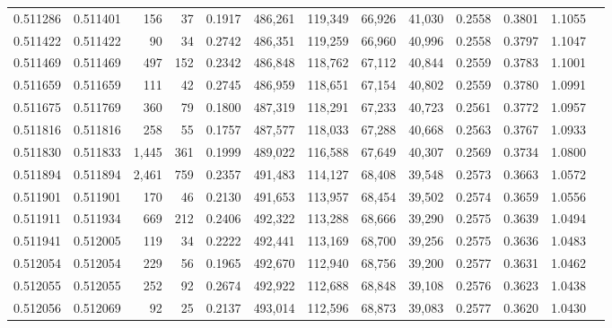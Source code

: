 \begin{tabular}{rrrrrrrrrrrrr}
0.511286 & 0.511401 &   156 &    37 &                                     0.1917 & 486,261 & 119,349 &  66,926 &  41,030 & 0.2558 & 0.3801 & 1.1055 \\
0.511422 & 0.511422 &    90 &    34 &                                     0.2742 & 486,351 & 119,259 &  66,960 &  40,996 & 0.2558 & 0.3797 & 1.1047 \\
0.511469 & 0.511469 &   497 &   152 &                                     0.2342 & 486,848 & 118,762 &  67,112 &  40,844 & 0.2559 & 0.3783 & 1.1001 \\
0.511659 & 0.511659 &   111 &    42 &                                     0.2745 & 486,959 & 118,651 &  67,154 &  40,802 & 0.2559 & 0.3780 & 1.0991 \\
0.511675 & 0.511769 &   360 &    79 &                                     0.1800 & 487,319 & 118,291 &  67,233 &  40,723 & 0.2561 & 0.3772 & 1.0957 \\
0.511816 & 0.511816 &   258 &    55 &                                     0.1757 & 487,577 & 118,033 &  67,288 &  40,668 & 0.2563 & 0.3767 & 1.0933 \\
0.511830 & 0.511833 & 1,445 &   361 &                                     0.1999 & 489,022 & 116,588 &  67,649 &  40,307 & 0.2569 & 0.3734 & 1.0800 \\
0.511894 & 0.511894 & 2,461 &   759 &                                     0.2357 & 491,483 & 114,127 &  68,408 &  39,548 & 0.2573 & 0.3663 & 1.0572 \\
0.511901 & 0.511901 &   170 &    46 &                                     0.2130 & 491,653 & 113,957 &  68,454 &  39,502 & 0.2574 & 0.3659 & 1.0556 \\
0.511911 & 0.511934 &   669 &   212 &                                     0.2406 & 492,322 & 113,288 &  68,666 &  39,290 & 0.2575 & 0.3639 & 1.0494 \\
0.511941 & 0.512005 &   119 &    34 &                                     0.2222 & 492,441 & 113,169 &  68,700 &  39,256 & 0.2575 & 0.3636 & 1.0483 \\
0.512054 & 0.512054 &   229 &    56 &                                     0.1965 & 492,670 & 112,940 &  68,756 &  39,200 & 0.2577 & 0.3631 & 1.0462 \\
0.512055 & 0.512055 &   252 &    92 &                                     0.2674 & 492,922 & 112,688 &  68,848 &  39,108 & 0.2576 & 0.3623 & 1.0438 \\
0.512056 & 0.512069 &    92 &    25 &                                     0.2137 & 493,014 & 112,596 &  68,873 &  39,083 & 0.2577 & 0.3620 & 1.0430 \\

\end{tabular}
